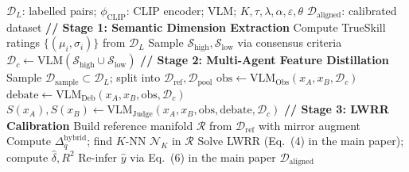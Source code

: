 \documentclass[runningheads]{llncs}
\begin{document}
\begin{algorithm}[ht]
\caption{UrbanAlign: Post-hoc VLM Calibration for Urban Perception}
\label{alg:urbanalign}
\small
\begin{algorithmic}[1]
\REQUIRE $\mathcal{D}_{L}$: labelled pairs; $\phi_{\text{CLIP}}$: CLIP encoder; VLM; $K,\tau,\lambda,\alpha,\varepsilon,\theta$
\ENSURE $\mathcal{D}_{\mathrm{aligned}}$: calibrated dataset
\STATE \textbf{// Stage 1: Semantic Dimension Extraction}
\STATE Compute TrueSkill ratings $\{(\mu_i,\sigma_i)\}$ from $\mathcal{D}_{L}$
\STATE Sample $\mathcal{S}_{\mathrm{high}},\mathcal{S}_{\mathrm{low}}$ via consensus criteria
\STATE $\mathcal{D}_c \leftarrow \text{VLM}(\mathcal{S}_{\mathrm{high}}\cup\mathcal{S}_{\mathrm{low}})$ 
\STATE \textbf{// Stage 2: Multi-Agent Feature Distillation}
\STATE Sample $\mathcal{D}_{\mathrm{sample}}\subset\mathcal{D}_{L}$; split into $\mathcal{D}_{\mathrm{ref}}, \mathcal{D}_{\mathrm{pool}}$
  \STATE $\text{obs}\leftarrow\text{VLM}_{\mathrm{Obs}}(x_A,x_B,\mathcal{D}_c)$
  \STATE $\text{debate}\leftarrow\text{VLM}_{\mathrm{Deb}}(x_A,x_B,\text{obs},\mathcal{D}_c)$
  \STATE $S(x_A),S(x_B)\leftarrow\text{VLM}_{\mathrm{Judge}}(x_A,x_B,\text{obs},\text{debate},\mathcal{D}_c)$
\ENDFOR
\STATE \textbf{// Stage 3: LWRR Calibration}
\STATE Build reference manifold $\mathcal{R}$ from $\mathcal{D}_{\mathrm{ref}}$ with mirror augment
  \STATE Compute $\Delta_q^{\mathrm{hybrid}}$; find $K$-NN $\mathcal{N}_K$ in $\mathcal{R}$
  \STATE Solve LWRR (Eq.~(4) in the main paper); compute $\hat{\delta}, R^{2}$
  \STATE Re-infer $\hat{y}$ via Eq.~(6) in the main paper
\ENDFOR
\RETURN $\mathcal{D}_{\mathrm{aligned}}$
\end{algorithmic}
\end{algorithm}




\end{document}
